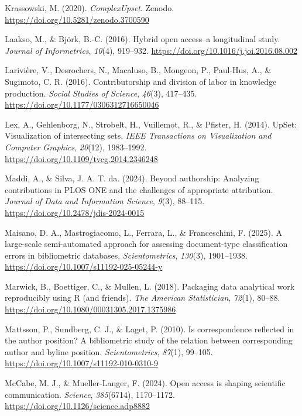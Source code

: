 \documentclass[a4paper,man,floatsintext,longtable,noextraspace,10pt]{apa6}
\newlength{\cslhangindent}
\newenvironment{CSLReferences}[2] %
{\begin{list}{}{%
  \setlength{\itemindent}{0pt}
  \setlength{\leftmargin}{0pt}
  \setlength{\parsep}{0pt}
  \ifodd #1
  \setlength{\leftmargin}{\cslhangindent}
  \setlength{\itemindent}{-1\cslhangindent}
  \fi
  \setlength{\itemsep}{#2\baselineskip}}}
{\end{list}}
\begin{document}
\begin{CSLReferences}{1}{0}
Krassowski, M. (2020). \emph{ComplexUpset}. Zenodo.
\url{https://doi.org/10.5281/zenodo.3700590}

Laakso, M., \& Björk, B.-C. (2016). Hybrid open access--a longitudinal
study. \emph{Journal of Informetrics}, \emph{10}(4), 919--932.
\url{https://doi.org/10.1016/j.joi.2016.08.002}

Larivière, V., Desrochers, N., Macaluso, B., Mongeon, P., Paul-Hus, A.,
\& Sugimoto, C. R. (2016). Contributorship and division of labor in
knowledge production. \emph{Social Studies of Science}, \emph{46}(3),
417--435. \url{https://doi.org/10.1177/0306312716650046}

Lex, A., Gehlenborg, N., Strobelt, H., Vuillemot, R., \& Pfister, H.
(2014). UpSet: Visualization of intersecting sets. \emph{IEEE
Transactions on Visualization and Computer Graphics}, \emph{20}(12),
1983--1992. \url{https://doi.org/10.1109/tvcg.2014.2346248}

Maddi, A., \& Silva, J. A. T. da. (2024). Beyond authorship: Analyzing
contributions in PLOS ONE and the challenges of appropriate attribution.
\emph{Journal of Data and Information Science}, \emph{9}(3), 88--115.
\url{https://doi.org/10.2478/jdis-2024-0015}

Maisano, D. A., Mastrogiacomo, L., Ferrara, L., \& Franceschini, F.
(2025). A large-scale semi-automated approach for assessing
document-type classification errors in bibliometric databases.
\emph{Scientometrics}, \emph{130}(3), 1901--1938.
\url{https://doi.org/10.1007/s11192-025-05244-y}

Marwick, B., Boettiger, C., \& Mullen, L. (2018). Packaging data
analytical work reproducibly using {R} (and friends). \emph{The American
Statistician}, \emph{72}(1), 80--88.
\url{https://doi.org/10.1080/00031305.2017.1375986}

Mattsson, P., Sundberg, C. J., \& Laget, P. (2010). Is correspondence
reflected in the author position? A bibliometric study of the relation
between corresponding author and byline position. \emph{Scientometrics},
\emph{87}(1), 99--105. \url{https://doi.org/10.1007/s11192-010-0310-9}

McCabe, M. J., \& Mueller-Langer, F. (2024). Open access is shaping
scientific communication. \emph{Science}, \emph{385}(6714), 1170--1172.
\url{https://doi.org/10.1126/science.adp8882}


\end{CSLReferences}
\end{document}
